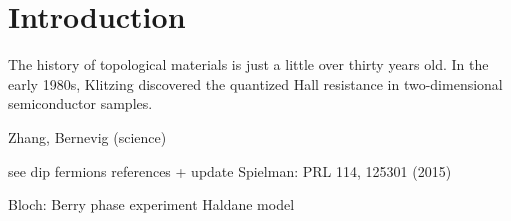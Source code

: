 \chapter*{Introduction}


The history of topological materials is just a little over thirty years old. In the early 1980s,
Klitzing discovered the quantized Hall resistance in two-dimensional semiconductor samples.

\cite{Klitzing1980,Klitzing1992}

\cite{Laughlin1981,Halperin1982}

\cite{Niu1985,Thouless1982,Kohmoto1985,Kohmoto1989}

\cite{Tsui1982}

\cite{Willett1987}

\cite{Haldane1988}

\cite{Kitaev2003}

\cite{Kane2005a,Kane2005,Hasan2010}

Zhang, Bernevig (science)


see dip fermions references + update
Spielman: PRL 114, 125301 (2015)

\cite{Aidelsburger2011,Aidelsburger2013,Miyake2013}

Bloch: Berry phase experiment
Haldane model \cite{Jotzu2014}




